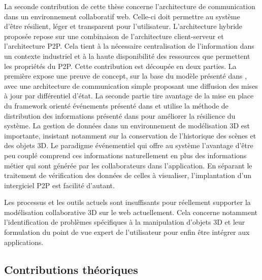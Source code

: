 La seconde contribution de cette thèse concerne l'architecture de 
communication dans un environnement collaboratif web. Celle-ci doit permettre au système 
d'être résilient, léger et transparent pour l'utilisateur. 
L'architecture hybride proposée repose sur une combinaison de l'architecture 
client-serveur et l'architecture \gls{P2P}. 
Cela tient à la nécessaire centralisation de l'information dans un contexte industriel 
et à la haute disponibilité des ressources que permettent les propriétés du 
\gls{P2P}. Cette contribution est découpée en deux parties. 
La première expose une preuve de concept, sur la base du modèle présenté dans 
\cite{Desprat2015a, Desprat2015b}, avec une architecture de communication simple proposant 
une diffusion des mises à jour par différentiel d'état. La seconde partie 
tire avantage de la mise en place du \gls{framework} orienté événements présenté 
dans \cite{Desprat2016} et utilise la méthode de distribution des informations 
présenté dans \cite{Desprat2017} pour améliorer la résilience du système. 
La gestion de données dans un environnement de modélisation 3D est importante, insistant notamment sur la conservation de l'historique des scènes et des objets \gls{3D}. Le paradigme événementiel qui offre au système l'avantage d'être peu couplé comprend ces informations naturellement en plus des informations métier qui sont générée par les collaborateurs dans l'application. En séparant le traitement de vérification des données de celles à visualiser, l'implantation d'un intergiciel \gls{P2P} est facilité d'autant. 

Les processus et les outils actuels sont insuffisants pour réellement supporter la modélisation collaborative \gls{3D} sur le web actuellement. Cela concerne notamment l'identification de problèmes spécifiques à la manipulation d'objets 3D et leur formulation du point de vue expert de l'utilisateur pour enfin être intégrer aux applications. 


\subsection{Contributions théoriques}

